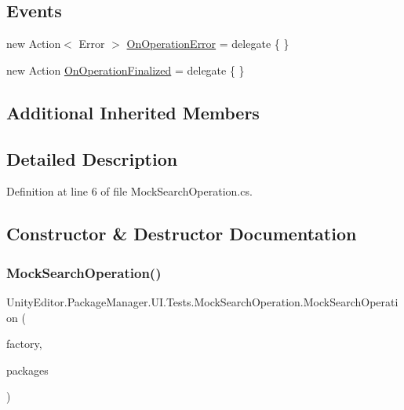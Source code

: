 \subsection*{Events}
\begin{DoxyCompactItemize}
\item 
new Action$<$ Error $>$ \mbox{\hyperlink{class_unity_editor_1_1_package_manager_1_1_u_i_1_1_tests_1_1_mock_search_operation_ac8ac897b205580ab4e533d8e24f3525f}{On\+Operation\+Error}} = delegate \{ \}
\item 
new Action \mbox{\hyperlink{class_unity_editor_1_1_package_manager_1_1_u_i_1_1_tests_1_1_mock_search_operation_a99c3db8fba2c1ac12e115cc20746c0c8}{On\+Operation\+Finalized}} = delegate \{ \}
\end{DoxyCompactItemize}
\subsection*{Additional Inherited Members}


\subsection{Detailed Description}


Definition at line 6 of file Mock\+Search\+Operation.\+cs.



\subsection{Constructor \& Destructor Documentation}
\mbox{\label{class_unity_editor_1_1_package_manager_1_1_u_i_1_1_tests_1_1_mock_search_operation_a1e3de6863ff77b815516cb10a818bd1c}} 
\subsubsection{\texorpdfstring{MockSearchOperation()}{MockSearchOperation()}}
{\footnotesize\ttfamily Unity\+Editor.\+Package\+Manager.\+U\+I.\+Tests.\+Mock\+Search\+Operation.\+Mock\+Search\+Operation (\begin{DoxyParamCaption}\item[{\mbox{\hyperlink{class_unity_editor_1_1_package_manager_1_1_u_i_1_1_tests_1_1_mock_operation_factory}{Mock\+Operation\+Factory}}}]{factory,  }\item[{I\+Enumerable$<$ \mbox{\hyperlink{class_unity_editor_1_1_package_manager_1_1_u_i_1_1_package_info}{Package\+Info}} $>$}]{packages }\end{DoxyParamCaption})}



